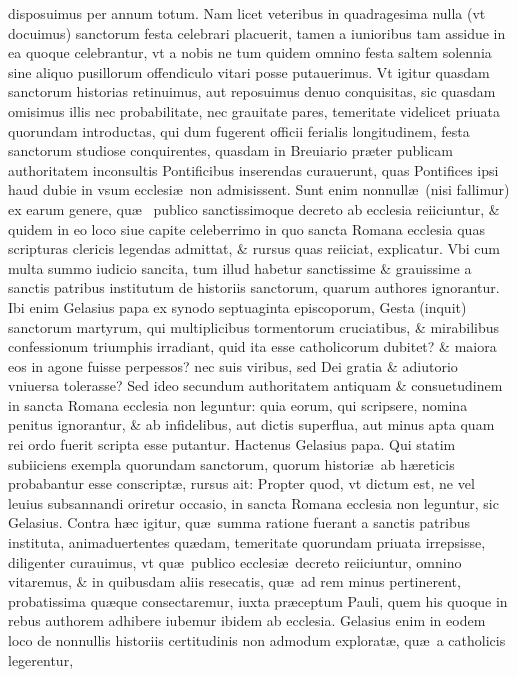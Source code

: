 \documentclass[a5paper,10pt]{book}
\def\ae{æ}
\begin{document}
disposuimus per annum totum.
Nam licet veteribus in quadragesima nulla (vt docuimus) sanctorum %
festa celebrari placuerit, tamen a iunioribus tam assidue in ea quoque celebrantur, vt a nobis ne tum quidem omnino festa saltem solennia sine aliquo pusillorum offendiculo vitari
posse putauerimus.
Vt igitur quasdam sanctorum historias retinuimus, aut reposuimus denuo conquisitas, sic quasdam omisimus illis nec probabilitate, nec grauitate pares, temeritate videlicet priuata quorundam introductas, qui dum fugerent officii ferialis longitudinem, festa sanctorum %
studiose conquirentes, quasdam in Breuiario pr\ae ter publicam authoritatem inconsultis Pontificibus inserendas curauerunt, quas Pontifices ipsi haud dubie in vsum ecclesi\ae \ non admisissent.
Sunt enim nonnull\ae \ (nisi fallimur) ex earum genere, qu\ae \ %
publico sanctissimoque decreto ab ecclesia reiiciuntur, \& quidem in eo loco siue capite celeberrimo in quo sancta Romana ecclesia quas scripturas clericis legendas admittat, \& rursus quas reiiciat, explicatur.
Vbi cum multa summo iudicio sancita, tum illud habetur sanctissime \& grauissime a sanctis patribus institutum de historiis sanctorum, %
quarum authores ignorantur.
Ibi enim Gelasius papa ex synodo septuaginta episcoporum, Gesta (inquit) sanctorum %
martyrum, qui multiplicibus tormentorum cruciatibus, \& mirabilibus confessionum triumphis irradiant, quid ita esse catholicorum dubitet?
\& maiora eos in agone fuisse perpessos?
nec suis viribus, sed Dei gratia \& adiutorio vniuersa tolerasse?
Sed ideo secundum authoritatem antiquam \& consuetudinem in sancta Romana ecclesia non leguntur:
quia eorum, qui scripsere, nomina penitus ignorantur, \& ab infidelibus, aut dictis superflua, aut minus apta quam %
rei ordo fuerit scripta esse putantur.
Hactenus Gelasius papa.
Qui statim subiiciens exempla quorundam sanctorum, %
quorum histori\ae \ ab h\ae reticis probabantur esse conscript\ae , rursus ait:
Propter quod, vt dictum est, ne vel leuius subsannandi oriretur occasio, in sancta Romana ecclesia non leguntur, sic Gelasius.
Contra h\ae c igitur, qu\ae \ summa ratione fuerant a sanctis patribus instituta, animaduertentes qu\ae dam, temeritate quorundam priuata irrepsisse, diligenter curauimus, vt qu\ae \ publico ecclesi\ae \ decreto reiiciuntur, omnino vitaremus, \& in quibusdam aliis resecatis, qu\ae \ ad rem minus pertinerent, probatissima qu\ae que consectaremur, iuxta pr\ae ceptum Pauli, quem his quoque in rebus authorem adhibere iubemur ibidem ab ecclesia.
Gelasius enim in eodem loco de nonnullis historiis certitudinis non admodum explorat\ae , qu\ae \ a catholicis legerentur,
\end{document}

